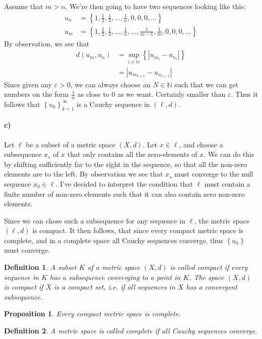\documentclass[a4paper]{article}
\newtheorem{defn}{Definition}
\theoremstyle{plain}
\newtheorem{prp}{Proposition}
\begin{document}
Assume that $m > n$. We're then going to have two sequences looking like this:
\begin{align*}
  \label{eq:}
  u_n &= \left\{ 1, \frac{1}{2}, \frac{1}{3},  \dots , \frac{1}{n}, 0, 0, 0, \dots \right\} \\
  u_m &= \left\{ 1, \frac{1}{2}, \frac{1}{3},  \dots,  \frac{1}{n}, \dots, \frac{1}{m-1}, \frac{1}{m}, 0, 0, 0, \dots \right\}
\end{align*}
By observation, we see that
\begin{align*}
  d(u_m, u_n) &= \sup_{i\in\mathbb{N}}\left\{ \left|u_{m_{i}} - u_{n_{i}} \right|\right\} \\
  &= \left|u_{m_{n+1}} - u_{n_{n+1}}\right|
\end{align*}
Since given any $\varepsilon > 0$, we can always choose an $N \in \mathbb{N}$
such that we can get numbers on the form $\frac{1}{n}$ as close to $0$ as we
want. Certainly smaller than $\varepsilon$.  Thus it follows that $\left\{ u_k
\right\}_{k=1}^{\infty}$ is a Cauchy sequence in $\left( \ell, d \right).$

\paragraph{c)}

Let $\ell$ be a subset of a metric space $\left( X, d \right)$.  Let $x \in
\ell$, and choose a subsequence $x_s$ of $x$ that only contains all the
zero-elements of $x$. We can do this by shifting sufficiently far to the right
in the sequence, so that all the non-zero elements are to the left.  By
observation we see that $x_s$ must converge to the null sequence $x_0 \in
\ell$.  I've decided to interpret the condition that $\ell$ must contain a
finite number of non-zero elements such that it can also contain zero non-zero
elements. 

Since we can chose such a subsequence for any sequence in $\ell$, the metric
space $\left( \ell, d \right)$ is compact. It then follows, that since every compact metric space is complete, and
in a complete space all Cauchy sequences converge, thus $\left\{ u_k \right\}$ must converge.
\begin{defn}
  A subset $K$ of a metric space $\left( X, d \right)$ is called compact if every sequence in $K$ has a subsequence converging to a point in $K$.
  The space $(X, d)$ is compact if $X$ is a compact set, i.e. if all sequences in $X$ has a convergent subsequence.
\end{defn}
\begin{prp}
  Every compact metric space is complete.
\end{prp}

\begin{defn}
  A metric space is called complete if all Cauchy sequences converge.
\end{defn}
\end{document}

